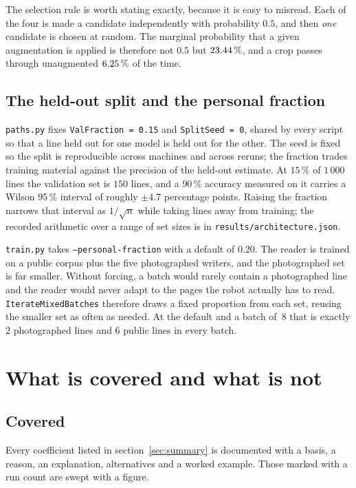 \documentclass[11pt,a4paper]{article}
\begin{document}
The selection rule is worth stating exactly, because it is easy to misread.
Each of the four is made a candidate independently with probability $0.5$, and
then \emph{one} candidate is chosen at random. The marginal probability that a
given augmentation is applied is therefore not $0.5$ but
$23.44\,\%$, and a crop passes through unaugmented
$6.25\,\%$ of the time.

\subsection{The held-out split and the personal fraction}

\texttt{paths.py} fixes \texttt{ValFraction = 0.15} and
\texttt{SplitSeed = 0}, shared by every script so that a line held out for one
model is held out for the other. The seed is fixed so the split is reproducible
across machines and across reruns; the fraction trades training material
against the precision of the held-out estimate. At $15\,\%$ of $1\,000$ lines
the validation set is $150$ lines, and a $90\,\%$ accuracy measured on it
carries a Wilson $95\,\%$ interval \cite{wilson1927} of roughly $\pm 4.7$
percentage points. Raising the fraction narrows that interval as
$1/\sqrt{n}$ while taking lines away from training; the recorded arithmetic over
a range of set sizes is in \texttt{results/architecture.json}.

\texttt{train.py} takes \texttt{--personal-fraction} with a default of $0.20$.
The reader is trained on a public corpus plus the five photographed writers, and
the photographed set is far smaller. Without forcing, a batch would rarely
contain a photographed line and the reader would never adapt to the pages the
robot actually has to read. \texttt{IterateMixedBatches} therefore draws a fixed
proportion from each set, reusing the smaller set as often as needed. At the
default and a batch of~8 that is exactly $2$ photographed lines and $6$ public
lines in every batch.

\section{What is covered and what is not}

\subsection{Covered}

Every coefficient listed in section~\ref{sec:summary} is documented with a
basis, a reason, an explanation, alternatives and a worked example. Those marked
with a run count are swept with a figure.
\end{document}
